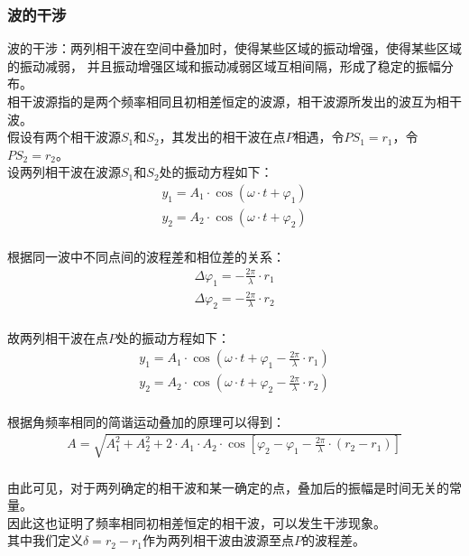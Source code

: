 \documentclass[UTF8]{ctexart}
\begin{document}
\subsubsection{波的干涉}
    波的干涉：两列相干波在空间中叠加时，使得某些区域的振动增强，使得某些区域的振动减弱，
    并且振动增强区域和振动减弱区域互相间隔，形成了稳定的振幅分布。\\[3mm]
    相干波源指的是两个频率相同且初相差恒定的波源，相干波源所发出的波互为相干波。\\[3mm]
    假设有两个相干波源$S_1$和$S_2$，其发出的相干波在点$P$相遇，令$PS_1=r_1$，令$PS_2=r_2$。\\[3mm]
    设两列相干波在波源$S_1$和$S_2$处的振动方程如下：
    \setcounter{equation}{0}
    \begin{align}
        y_1=A_1\cdot\cos{\left(\omega\cdot t+\varphi_1\right)}\\[3mm]
        y_2=A_2\cdot\cos{\left(\omega\cdot t+\varphi_2\right)}
    \end{align}\\
    根据同一波中不同点间的波程差和相位差的关系：
    \begin{align}
        \Delta\varphi_1=-\frac{2\pi}{\lambda}\cdot r_1\\[3mm]
        \Delta\varphi_2=-\frac{2\pi}{\lambda}\cdot r_2
    \end{align}\\
    故两列相干波在点$P$处的振动方程如下：
    \begin{align}
        y_1=A_1\cdot\cos{\left(\omega\cdot t+\varphi_1-\frac{2\pi}{\lambda}\cdot r_1\right)}\\[3mm]
        y_2=A_2\cdot\cos{\left(\omega\cdot t+\varphi_2-\frac{2\pi}{\lambda}\cdot r_2\right)}
    \end{align}\\
    根据角频率相同的简谐运动叠加的原理可以得到：\vspace{5pt}
    \begin{align}
        A=\sqrt{A_1^2+A_2^2+2\cdot A_1\cdot A_2\cdot\cos\left[\varphi_2-\varphi_1-\frac{2\pi}{\lambda}\cdot\left(r_2-r_1\right)\right]}
    \end{align}\\
    由此可见，对于两列确定的相干波和某一确定的点，叠加后的振幅是时间无关的常量。\\[3mm]
    因此这也证明了频率相同初相差恒定的相干波，可以发生干涉现象。\\[6mm]
    其中我们定义$\delta=r_2-r_1$作为两列相干波由波源至点$P$的波程差。
    
\end{document}
